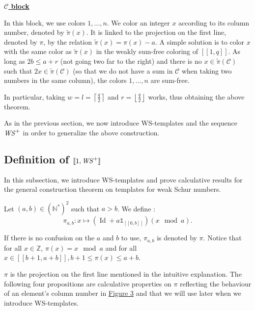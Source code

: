\noindent \underline{\textbf{\(\mathcal{C}\) block}}
\par
In this block,  we use colors \(1, ..., n\). We color an integer \(x\) according to its column number, denoted by \(\tilde{\pi}(x)\). It is linked to the
projection on the first line, denoted by \(\pi\), by the relation \(\tilde{\pi}(x) = \pi(x) - a\). A simple solution is to color \(x\) with the same color
as \(\tilde{\pi}(x)\) in the weakly sum-free coloring of \([\![1,q]\!]\). As long as \(2b \leqslant a + r\) (not going two far to the right) and there
is no \(x \in \tilde{\pi}(\mathcal{C})\) such that \(2x \in \tilde{\pi}(\mathcal{C})\) (so that we do not have a sum in \(\mathcal{C}\) when
taking two numbers in the same column), the colors \(1, ..., n\) are sum-free.

In particular, taking \(w = l = \left\lceil \displaystyle \frac{q}{2} \right\rceil\) and \(r = \left\lfloor \displaystyle \frac{q}{2} \right\rfloor\) works, thus obtaining the above theorem.\\
\par
As in the previous section, we now introduce WS-templates and the sequence \(\mathit{WS}^+\) in order to generalize the above construction.

\subsection{Definition of \([\![ 1, \mathit{WS}^+ ]\!]\)}
\label{DefinitionWS+}

\qquad In this subsection, we introduce WS-templates and prove calculative results for the general construction
theorem on templates for weak Schur numbers.

\begin{definition}
Let \((a,b) \in (\mathbb{N}^*)^2\) such that \(a>b\). We define :
\[ \pi_{a,b}:x \longmapsto (\operatorname{Id}+a\mathds{1}_{ [\![0,b]\!]})(x \mod a).\]
\end{definition}

\begin{sloppypar}
If there is no confusion on the \(a\) and \(b\) to use, \(\pi_{a, b}\) is denoted by \(\pi\). Notice that for all \(x \in \mathbb{Z}\), 
\({\pi(x) = x \mod a}\) and for all \(x \in [\![b + 1, a + b]\!], b + 1 \leqslant \pi(x) \leqslant a + b\).
\end{sloppypar}

\begin{sloppypar}
\(\pi\) is the projection on the first line mentioned in the intuitive explanation. The following four propositions are
calculative properties on \(\pi\) reflecting the behaviour of an element's column number in \hyperref[SchemaWS]{Figure 3} and
that we will use later when we introduce WS-templates.
\end{sloppypar}

